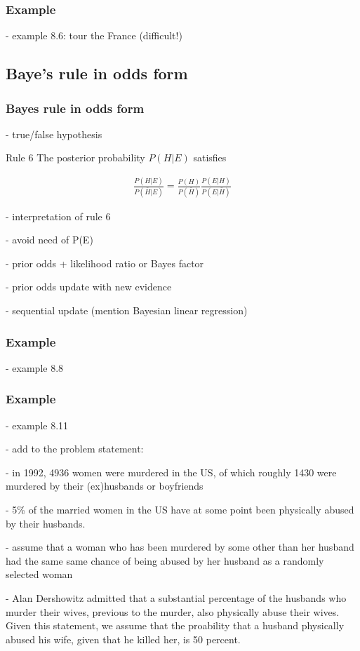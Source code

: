 \begin{frame}
    \frametitle{Example}

- example 8.6: tour the France (difficult!)

\end{frame}

\subsection{Baye's rule in odds form}

\begin{frame}
    \frametitle{Bayes rule in odds form}

- true/false hypothesis

    \begin{description}

        \item{Rule 6} The posterior probability $P(H|E)$ satisfies

            \begin{align*}
                \frac{P(H|E)}{P(\bar{H}|E)} = \frac{P(H)}{P(\bar{H})}\frac{P(E|H)}{P(E|\bar{H})}
            \end{align*}

    \end{description}

- interpretation of rule 6

    - avoid need of P(E)

    - prior odds + likelihood ratio or Bayes factor

    - prior odds update with new evidence

    - sequential update (mention Bayesian linear regression)

\end{frame}

\begin{frame}
    \frametitle{Example}

- example 8.8

\end{frame}

\begin{frame}
    \frametitle{Example}

- example 8.11

    - add to the problem statement:

        - in 1992, 4936 women were murdered in the US, of which roughly 1430 were murdered by their (ex)husbands or boyfriends

        - 5\% of the married women in the US have at some point been physically abused by their husbands.

        - assume that a woman who has been murdered by some other than her husband had the same same chance of being abused by her husband as a randomly selected woman

        - Alan Dershowitz admitted that a substantial percentage of the husbands who murder their wives, previous to the murder, also physically abuse their wives. Given this statement, we assume that the proability that a husband physically abused his wife, given that he killed her, is 50 percent.

\end{frame}

